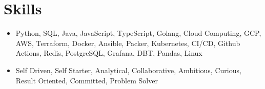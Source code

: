 \section{Skills}
\begin{itemize}
  \item Python, SQL, Java, JavaScript, TypeScript, Golang, Cloud Computing, GCP, AWS, Terraform, Docker, Ansible, Packer, Kubernetes, CI/CD, Github Actions, Redis, PostgreSQL, Grafana, DBT, Pandas, Linux
  \item Self Driven, Self Starter, Analytical, Collaborative, Ambitious, Curious, Result Oriented, Committed, Problem Solver
\end{itemize}
